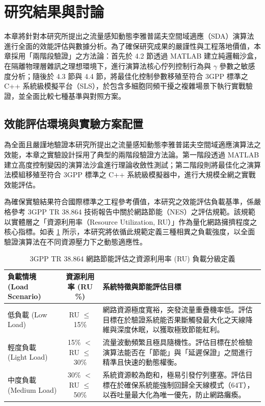 
\section{研究結果與討論}
\label{chap:results}

本章將針對本研究所提出之流量感知動態李雅普諾夫空間域適應（SDA）演算法進行全面的效能評估與數據分析。為了確保研究成果的嚴謹性與工程落地價值，本章採用「兩階段驗證」之方法論：首先於 4.2 節透過 MATLAB 建立純邏輯沙盒，在隔離物理層雜訊之理想環境下，進行演算法核心佇列控制行為與 $\gamma$ 參數之敏感度分析；隨後於 4.3 節與 4.4 節，將最佳化控制參數移殖至符合 3GPP 標準之 C++ 系統級模擬平台（SLS），於包含多細胞同頻干擾之複雜場景下執行實戰驗證，並全面比較七種基準與對照方案。

\subsection{效能評估環境與實驗方案配置}
\label{sec:setup}

為全面且嚴謹地驗證本研究所提出之流量感知動態李雅普諾夫空間域適應演算法之效能，本章之實驗設計採用了典型的兩階段驗證方法論。第一階段透過 MATLAB 建立高度控制變因的演算法沙盒進行理論收斂性測試；第二階段則將最佳化之演算法模組移殖至符合 3GPP 標準之 C++ 系統級模擬器中，進行大規模全網之實戰效能評估。

為確保實驗結果符合國際標準之工程參考價值，本研究之效能評估負載基準，係嚴格參考 3GPP TR 38.864 技術報告中關於網路節能（NES）之評估規範\cite{3gpp2023_tr38864}。該規範以實體層之「資源利用率（Resource Utilization, RU）」作為量化網路擁擠程度之核心指標。如表 \ref{tab:3gpp_load_definition} 所示，本研究將依循此規範定義三種相異之負載強度，以全面驗證演算法在不同資源壓力下之動態適應性。

\begin{table}[htbp]
\centering
\caption{3GPP TR 38.864 網路節能評估之資源利用率 (RU) 負載分級定義}
\label{tab:3gpp_load_definition}
\renewcommand{\arraystretch}{1.5}
\begin{tabularx}{\textwidth}{|l|c|X|}
\hline
\textbf{負載情境 (Load Scenario)}   & \textbf{資源利用率 (RU \%)}    & \textbf{系統特徵與節能評估目標} \\ \hline
低負載 (Low Load)                   & RU $\le$ 15\%                 & 網路資源極度寬裕，突發流量重疊機率低。評估目標在於驗證系統能否果斷觸發最大化之天線降維與深度休眠，以獲取極致節能紅利。 \\ \hline
輕度負載 (Light Load)               &15\% $<$ RU $\le$ 30\%         & 流量波動頻繁且極具隨機性。評估目標在於檢驗演算法能否在「節能」與「延遲保證」之間進行精準且快速的動態權衡。 \\ \hline
中度負載 (Medium Load)              & 30\% $<$ RU $\le$ 50\%        & 系統資源較為飽和，極易引發佇列壅塞。評估目標在於確保系統能強制回歸全天線模式（64T），以吞吐量最大化為唯一優先，防止網路癱瘓。 \\ \hline
\end{tabularx}
\end{table}

